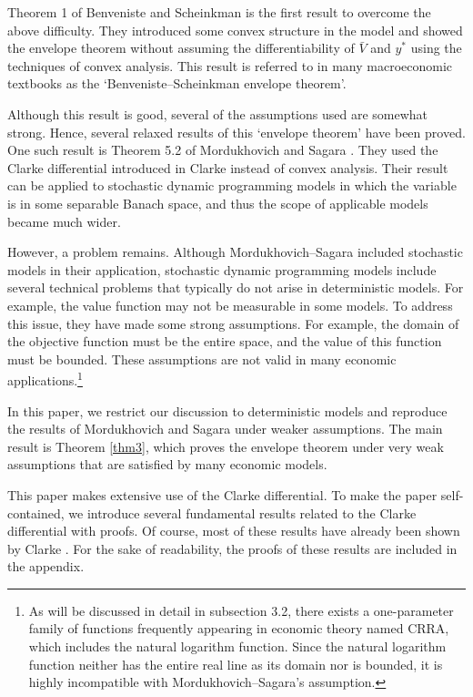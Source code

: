 \documentclass[a4paper,12pt]{article}
\theoremstyle{definition}
\begin{document}
Theorem 1 of Benveniste and Scheinkman \cite{BS} is the first result to overcome the above difficulty. They introduced some convex structure in the model and showed the envelope theorem without assuming the differentiability of $\bar{V}$ and $y^*$ using the techniques of convex analysis. This result is referred to in many macroeconomic textbooks as the `Benveniste--Scheinkman envelope theorem'.

Although this result is good, several of the assumptions used are somewhat strong. Hence, several relaxed results of this `envelope theorem' have been proved. One such result is Theorem 5.2 of Mordukhovich and Sagara \cite{MS}. They used the Clarke differential introduced in Clarke \cite{C83} instead of convex analysis. Their result can be applied to stochastic dynamic programming models in which the variable is in some separable Banach space, and thus the scope of applicable models became much wider.

However, a problem remains. Although Mordukhovich--Sagara included stochastic models in their application, stochastic dynamic programming models include several technical problems that typically do not arise in deterministic models. For example, the value function may not be measurable in some models. To address this issue, they have made some strong assumptions. For example, the domain of the objective function must be the entire space, and the value of this function must be bounded. These assumptions are not valid in many economic applications.\footnote{As will be discussed in detail in subsection 3.2, there exists a one-parameter family of functions frequently appearing in economic theory named CRRA, which includes the natural logarithm function. Since the natural logarithm function neither has the entire real line as its domain nor is bounded, it is highly incompatible with Mordukhovich--Sagara's assumption.}

In this paper, we restrict our discussion to deterministic models and reproduce the results of Mordukhovich and Sagara \cite{MS} under weaker assumptions. The main result is Theorem \ref{thm3}, which proves the envelope theorem under very weak assumptions that are satisfied by many economic models.

This paper makes extensive use of the Clarke differential. To make the paper self-contained, we introduce several fundamental results related to the Clarke differential with proofs. Of course, most of these results have already been shown by Clarke \cite{C83}. For the sake of readability, the proofs of these results are included in the appendix.
\end{document}
